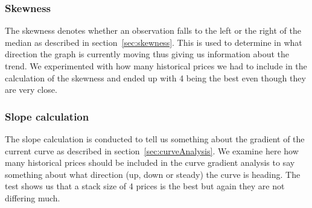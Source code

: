 \subsubsection{Skewness}
The skewness denotes whether an observation falls to the left or the right of the median as described in section~\ref{sec:skewness}. This is used to determine in what direction the graph is currently moving thus giving us information about the trend. We experimented with how many historical prices we had to include in the calculation of the skewness and ended up with 4 being the best even though they are very close.

\begin{table}[H]
\centering  %
\caption{Number of historical prices to include in the skewness calculation} %
\label{table:SkewnessTest} %
\end{table}

\subsubsection{Slope calculation}
The slope calculation is conducted to tell us something about the gradient of the current curve as described in section~\ref{sec:curveAnalysis}. We examine here how many historical prices should be included in the curve gradient analysis to say something about what direction (up, down or steady) the curve is heading. The test shows us that a stack size of 4 prices is the best but again they are not differing much.

